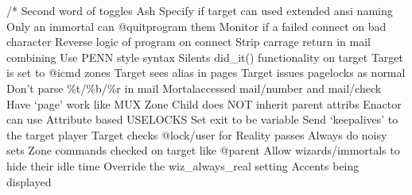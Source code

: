 \documentclass[letterpaper,10pt,english]{sphinxmanual}
\begin{document}
\sphinxAtStartPar
/* Second word of toggles \textendash{} Ash  Specify if target can used extended ansi naming  Only an immortal can @quitprogram them  Monitor if a failed connect on bad character  Reverse logic of program on connect  Strip carrage return in mail combining  Use PENN style syntax  Silents did\_it() functionality on target  Target is set to @icmd zones  Target sees alias in pages  Target issues pagelocks as normal  Don’t parse \%t/\%b/\%r in mail  Mortal\sphinxhyphen{}accessed mail/number and mail/check  Have ‘page’ work like MUX  Zone Child does NOT inherit parent attribs  Enactor can use Attribute based USELOCKS  Set exit to be variable  Send ‘keepalives’ to the target player  Target checks @lock/user for Reality passes  Always do noisy sets  Zone commands checked on target like @parent  Allow wizards/immortals to hide their idle time  Override the wiz\_always\_real setting  Accents being displayed \sphinxstyleemphasis{/
}
\end{document}

